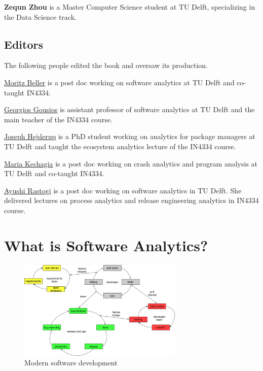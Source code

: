 \documentclass[]{book}
\begin{document}
\textbf{Zequn Zhou} is a Master Computer Science student at TU Delft,
specializing in the Data Science track.

\section*{Editors}\label{editors}

The following people edited the book and oversaw its production.

\href{http://inventitech.com}{Moritz Beller} is a post doc working on
software analytics at TU Delft and co-taught IN4334.

\href{http://gousios.org}{Georgios Gousios} is assistant professor of
software analytics at TU Delft and the main teacher of the IN4334
course.

\href{https://jhejderup.github.io/}{Joseph Hejderup} is a PhD student
working on analytics for package managers at TU Delft and taught the
ecosystem analytics lecture of the IN4334 course.

\href{https://mkechagia.github.io/}{Maria Kechagia} is a post doc
working on crash analytics and program analysis at TU Delft and
co-taught IN4334.

\href{https://ayushirastogi.github.io/}{Ayushi Rastogi} is a post doc
working on software analytics in TU Delft. She delivered lectures on
process analytics and release engineering analytics in IN4334 course.

\chapter{What is Software Analytics?}\label{what-is-software-analytics}

\begin{figure}
\centering
\includegraphics[width=0.70000\textwidth]{figures/modernse.png}
\caption{Modern software development}
\end{figure}
\end{document}
